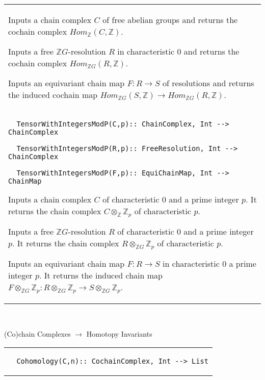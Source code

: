 \documentclass[a4paper,11pt]{report}
\begin{document}
{\begin{center}
\begin{tabular}{|l|}
 

 Inputs a chain complex $C$ of free abelian groups and returns the cochain complex $Hom_{\mathbb Z}(C,\mathbb Z)$. 

 Inputs a free $\mathbb ZG$-resolution $R$ in characteristic $0$ and returns the cochain complex $Hom_{\mathbb ZG}(R,\mathbb Z)$. 

 Inputs an equivariant chain map $F\colon R\rightarrow S$ of resolutions and returns the induced cochain map $Hom_{\mathbb ZG}(S,\mathbb Z) \longrightarrow Hom_{\mathbb ZG}(R,\mathbb Z)$. \\
 \index{TensorWithIntegersModP} 
\begin{verbatim}  TensorWithIntegersModP(C,p):: ChainComplex, Int --> ChainComplex
\end{verbatim}
 
\begin{verbatim}  TensorWithIntegersModP(R,p):: FreeResolution, Int --> ChainComplex
\end{verbatim}
 
\begin{verbatim}  TensorWithIntegersModP(F,p):: EquiChainMap, Int --> ChainMap
\end{verbatim}


 

 Inputs a chain complex $C$ of characteristic $0$ and a prime integer $p$. It returns the chain complex $C \otimes_{\mathbb Z} {\mathbb Z}_p$ of characteristic $p$. 

 Inputs a free $\mathbb ZG$-resolution $R$ of characteristic $0$ and a prime integer $p$. It returns the chain complex $R \otimes_{\mathbb ZG} {\mathbb Z}_p$ of characteristic $p$. 

 Inputs an equivariant chain map $F\colon R \rightarrow S$ in characteristic $0$ a prime integer $p$. It returns the induced chain map $F\otimes_{\mathbb ZG}\mathbb Z_p \colon R \otimes_{\mathbb ZG} {\mathbb Z}_p
\longrightarrow S \otimes_{\mathbb ZG} {\mathbb Z}_p$. \\
\end{tabular}\\[2mm]
\end{center}

 (Co)chain Complexes $\longrightarrow $ Homotopy Invariants \begin{center}
\begin{tabular}{|l|} \index{Cohomology} 
\begin{verbatim}  Cohomology(C,n):: CochainComplex, Int --> List
\end{verbatim}
 

\end{tabular}
\end{center}}
\end{document}
